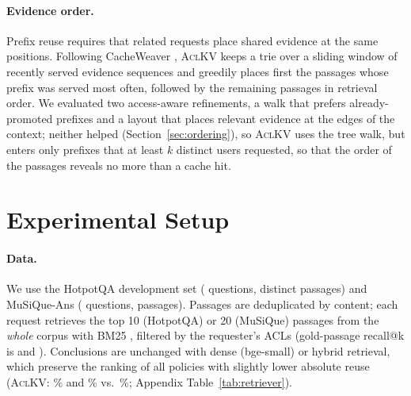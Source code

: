 \documentclass[11pt]{article}
\newcommand{\sysname}{\textsc{AclKV}\xspace}
\begin{document}
\paragraph{Evidence order.} Prefix reuse requires that related requests place shared evidence at the same positions. Following CacheWeaver \citep{tan2026cacheweaver}, \sysname keeps a trie over a sliding window of recently served evidence sequences and greedily places first the passages whose prefix was served most often, followed by the remaining passages in retrieval order. We evaluated two access-aware refinements, a walk that prefers already-promoted prefixes and a layout that places relevant evidence at the edges of the context; neither helped (Section~\ref{sec:ordering}), so \sysname uses the tree walk, but enters only prefixes that at least $k$ distinct users requested, so that the order of the passages reveals no more than a cache hit.

\section{Experimental Setup}
\label{sec:setup}

\paragraph{Data.} We use the HotpotQA development set \citep{yang2018hotpotqa} (\numquestionsHQ{} questions, \numpassagesHQ{} distinct passages) and MuSiQue-Ans \citep{trivedi2022musique} (\numquestionsMQ{} questions, \numpassagesMQ{} passages). Passages are deduplicated by content; each request retrieves the top 10 (HotpotQA) or 20 (MuSiQue) passages from the \emph{whole} corpus with BM25 \citep{robertson2009bm25}, filtered by the requester's ACLs (gold-passage recall@k is \numrecallHQ{} and \numrecallMQ{}). Conclusions are unchanged with dense (bge-small) or hybrid retrieval, which preserve the ranking of all policies with slightly lower absolute reuse (\sysname: \numretDenseACLKV\% and \numretHybridACLKV\% vs.\ \numretBmTwoFiveACLKV\%; Appendix Table~\ref{tab:retriever}).
\end{document}

